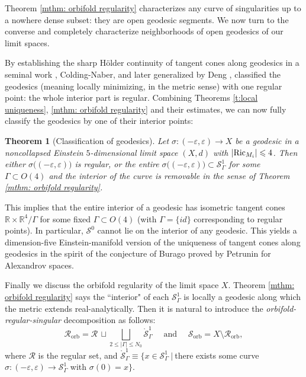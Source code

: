 \documentclass[11pt,reqno]{amsart}
\numberwithin{equation}{section}
\newcommand{\RR}{\mathds{R}}
\newcommand{\Ric}{{\rm Ric}}
\newcommand{\cR}{\mathcal{R}}
\newcommand{\cS}{\mathcal{S}}
\newtheorem{theorem}[thm]{Theorem}
\theoremstyle{definition}
\theoremstyle{remark}
\begin{document}
Theorem \ref{mthm: orbifold regularity} characterizes any curve of singularities up to a nowhere dense subset: they are open geodesic segments. We now turn to the converse and completely characterize neighborhoods of open geodesics of our limit spaces. 


By establishing the sharp H\"older continuity of tangent cones along geodesics in a seminal work \cite{con12}, Colding-Naber, and later generalized by Deng \cite{deng25}, classified the geodesics (meaning locally minimizing, in the metric sense) with one regular point: the whole interior part is regular. Combining Theorems \ref{t:local uniqueness}, \ref{mthm: orbifold regularity} and their estimates, we can now fully classify the geodesics by one of their interior points: 
\begin{theorem}[Classification of geodesics]\label{t:limit geodesic} 
    Let $\sigma:(-\varepsilon, \varepsilon)\to X$ be a geodesic in a noncollapsed Einstein $5$-dimensional limit space $(X,d)$ with $|\Ric_{M_i}| \leqslant 4$. Then either $\sigma\big((-\varepsilon, \varepsilon) \big)$ is regular, or the entire $\sigma\big((-\varepsilon, \varepsilon)\big)\subset\cS^1_{\Gamma}$ for some $\Gamma \subset O(4)$ and the interior of the curve is removable in the sense of Theorem \ref{mthm: orbifold regularity}.  
\end{theorem}



This implies that the entire interior of a geodesic has isometric tangent cones $\RR \times \RR^4/\Gamma$ for some fixed $\Gamma \subset O(4)$ (with $\Gamma=\{id\}$ corresponding to regular points). In particular, $\cS^0$ cannot lie on the interior of any geodesic. This yields a dimension-five Einstein-manifold version of the uniqueness of tangent cones along geodesics in the spirit of the conjecture of Burago proved by Petrunin \cite{bgp92, petrunin98} for Alexandrov spaces. 

Finally we discuss the orbifold regularity of the limit space $X$. Theorem \ref{mthm: orbifold regularity} says the ``interior" of each $\cS^1_{\Gamma}$ is locally a geodesic along which the metric extends real-analytically. Then it is natural to introduce the \emph{orbifold-regular-singular} decomposition as follows: 
\begin{equation}\label{e:orbifold-reg-sing}
    \mathcal{R}_{\mathrm{orb}} = \mathcal{R}\,\sqcup\bigsqcup_{{2\leqslant|\Gamma|\leqslant N_0}}\mathring{\mathcal{S}}^1_{\Gamma} \quad \text{ and } \quad \cS_{\mathrm{orb}} = X \setminus \cR_{\mathrm{orb}},
\end{equation}
where $\cR$ is the regular set, and $\mathring{\mathcal{S}}^1_{\Gamma} \equiv \{ x\in \cS^1_{\Gamma}~|~ $there exists some curve $\sigma:(-\varepsilon, \varepsilon) \to \cS^1_{\Gamma}$ with $\sigma(0) = x \}.$ 
\end{document}
